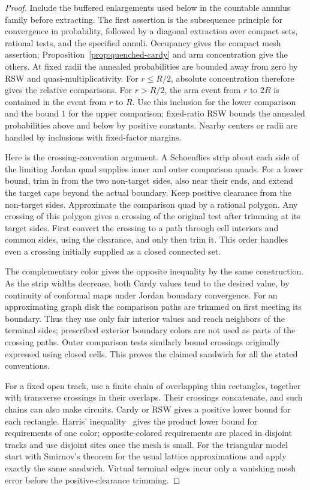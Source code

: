 \begin{proof}
Include the buffered enlargements used below in the countable annulus
family before extracting.
The first assertion is the subsequence principle for convergence
in probability, followed by a diagonal extraction over compact
sets, rational tests, and the specified annuli.  Occupancy gives
the compact mesh assertion; Proposition~\ref{prop:quenched-cardy}
and arm concentration give the others.  At fixed radii the
annealed probabilities are bounded away from zero by RSW and
quasi-multiplicativity.  For $r\le R/2$, absolute concentration therefore
gives the relative comparisons.  For $r>R/2$, the arm event from $r$ to
$2R$ is contained in the event from $r$ to $R$.  Use this inclusion for
the lower comparison and the bound $1$ for the upper comparison;
fixed-ratio RSW bounds the annealed probabilities above and below by
positive constants.  Nearby centers or radii are handled by inclusions
with fixed-factor margins.

Here is the crossing-convention argument.  A Schoenflies strip
about each side of the limiting Jordan quad supplies inner and
outer comparison quads.  For a lower bound, trim in from the two
non-target sides, also near their ends, and extend the target caps
beyond the actual boundary.  Keep positive clearance from the
non-target sides.  Approximate the comparison quad by a rational
polygon.  Any crossing of this polygon gives a crossing of the
original test after trimming at its target sides.  First convert
the crossing to a path through cell interiors and common sides,
using the clearance, and only then trim it.  This order handles
even a crossing initially supplied as a closed connected set.

The complementary color gives the opposite inequality by the
same construction.  As the strip widths decrease, both Cardy
values tend to the desired value, by continuity of conformal maps
under Jordan boundary convergence.  For an approximating graph
disk the comparison paths are trimmed on first meeting its
boundary.  Thus they use only fair interior values and reach
neighbors of the terminal sides; prescribed exterior boundary
colors are not used as parts of the crossing paths.  Outer
comparison tests similarly bound crossings originally expressed
using closed cells.  This proves the claimed sandwich for all
the stated conventions.

For a fixed open track, use a finite chain of overlapping thin
rectangles, together with transverse crossings in their overlaps.
Their crossings concatenate, and such chains can also make
circuits.  Cardy or RSW gives a positive lower bound for each
rectangle.  Harris' inequality~\cite{harris60} gives the product lower bound for
requirements of one color; opposite-colored requirements are
placed in disjoint tracks and use disjoint sites once the mesh is
small.  For the triangular model start with Smirnov's theorem
\cite{smirnov01} for the usual lattice approximations and apply
exactly the same sandwich.  Virtual terminal edges incur only a
vanishing mesh error before the positive-clearance trimming.
\end{proof}

